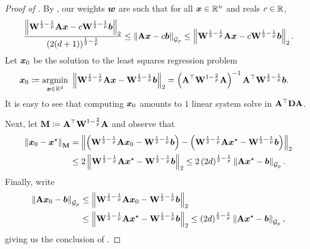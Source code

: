 \begin{proof}[Proof of ]
 By , our weights $\bm{w}$ are such that for all $\bm{x}\in\mathbb{R}^n$ and reals $c \in \mathbb{R}$,
\begin{align*}
    \frac{\left\lVert \mathbf{W}^{\frac{1}{2}-\frac{1}{p}}\mathbf{A}\bm{x}-c\mathbf{W}^{\frac{1}{2}-\frac{1}{p}}\bm{b} \right\rVert_2}{(2(d+1))^{\frac{1}{2}-\frac{1}{p}}} \le \left\lVert \mathbf{A}\bm{x}-c\bm{b} \right\rVert_{\mathcal{G}_{p}} \le \left\lVert \mathbf{W}^{\frac{1}{2}-\frac{1}{p}}\mathbf{A}\bm{x}-c\mathbf{W}^{\frac{1}{2}-\frac{1}{p}}\bm{b} \right\rVert_2.
\end{align*}
Let $\bm{x}_0$ be the solution to the least squares regression problem
\begin{align*}
    \bm{x}_0 &\coloneqq \underset{\bm{x}\in\mathbb{R}^d}{\mathrm{argmin}}\  \left\lVert \mathbf{W}^{\frac{1}{2}-\frac{1}{p}}\mathbf{A}\bm{x}-\mathbf{W}^{\frac{1}{2}-\frac{1}{p}}\bm{b} \right\rVert_2 = \left(\mathbf{A}^{\top}\mathbf{W}^{1-\frac{2}{p}}\mathbf{A}\right)^{-1}\mathbf{A}^{\top}\mathbf{W}^{\frac{1}{2}-\frac{1}{p}}\bm{b}.
\end{align*}
It is easy to see that computing $\bm{x}_0$ amounts to $1$ linear system solve in $\mathbf{A}^{\top}\mathbf{D}\mathbf{A}$.

Next, let $\mathbf{M} \coloneqq \mathbf{A}^{\top}\mathbf{W}^{1-\frac{2}{p}}\mathbf{A}$ and observe that
\begin{align*}
    \left\lVert \bm{x}_0-\bm{x}^{\star} \right\rVert_{\mathbf{M}} &= \left\lVert \left(\mathbf{W}^{\frac{1}{2}-\frac{1}{p}}\mathbf{A}\bm{x}_0-\mathbf{W}^{\frac{1}{2}-\frac{1}{p}}\bm{b}\right) - \left(\mathbf{W}^{\frac{1}{2}-\frac{1}{p}}\mathbf{A}\bm{x}^{\star}-\mathbf{W}^{\frac{1}{2}-\frac{1}{p}}\bm{b}\right) \right\rVert_2 \\
    &\le 2\left\lVert \mathbf{W}^{\frac{1}{2}-\frac{1}{p}}\mathbf{A}\bm{x}^{\star}-\mathbf{W}^{\frac{1}{2}-\frac{1}{p}}\bm{b} \right\rVert_2 \le 2\left(2d\right)^{\frac{1}{2}-\frac{1}{p}}\left\lVert \mathbf{A}\bm{x}^{\star}-\bm{b} \right\rVert_{\mathcal{G}_{p}}.
\end{align*}
Finally, write
\begin{align*}
    \left\lVert \mathbf{A}\bm{x}_0-\bm{b} \right\rVert_{\mathcal{G}_{p}} &\le \left\lVert \mathbf{W}^{\frac{1}{2}-\frac{1}{p}}\mathbf{A}\bm{x}_0-\mathbf{W}^{\frac{1}{2}-\frac{1}{p}}\bm{b} \right\rVert_2 \\
    &\le \left\lVert \mathbf{W}^{\frac{1}{2}-\frac{1}{p}}\mathbf{A}\bm{x}^{\star}-\mathbf{W}^{\frac{1}{2}-\frac{1}{p}}\bm{b} \right\rVert_2 \le \left(2d\right)^{\frac{1}{2}-\frac{1}{p}}\left\lVert \mathbf{A}\bm{x}^{\star}-\bm{b} \right\rVert_{\mathcal{G}_{p}},
\end{align*}
giving us the conclusion of .
\end{proof}

